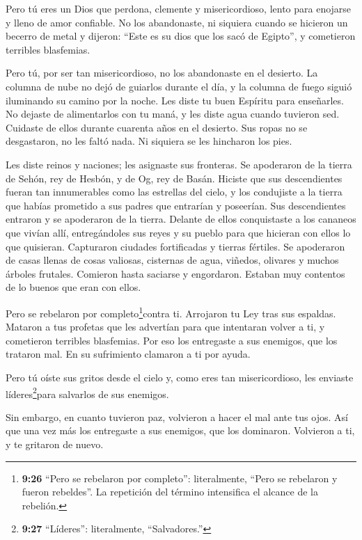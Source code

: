 Pero tú eres un Dios que perdona, clemente y misericordioso, lento para
enojarse y lleno de amor confiable. No los abandonaste,  ni
siquiera cuando se hicieron un becerro de metal y dijeron: ``Este es su
dios que los sacó de Egipto'', y cometieron terribles blasfemias.

 Pero tú, por ser tan misericordioso, no los abandonaste en
el desierto. La columna de nube no dejó de guiarlos durante el día, y la
columna de fuego siguió iluminando su camino por la noche. 
Les diste tu buen Espíritu para enseñarles. No dejaste de alimentarlos
con tu maná, y les diste agua cuando tuvieron sed. 
Cuidaste de ellos durante cuarenta años en el desierto. Sus ropas no se
desgastaron, no les faltó nada. Ni siquiera se les hincharon los pies.

 Les diste reinos y naciones; les asignaste sus fronteras.
Se apoderaron de la tierra de Sehón, rey de Hesbón, y de Og, rey de
Basán.  Hiciste que sus descendientes fueran tan
innumerables como las estrellas del cielo, y los condujiste a la tierra
que habías prometido a sus padres que entrarían y poseerían.
 Sus descendientes entraron y se apoderaron de la tierra.
Delante de ellos conquistaste a los cananeos que vivían allí,
entregándoles sus reyes y su pueblo para que hicieran con ellos lo que
quisieran.  Capturaron ciudades fortificadas y tierras
fértiles. Se apoderaron de casas llenas de cosas valiosas, cisternas de
agua, viñedos, olivares y muchos árboles frutales. Comieron hasta
saciarse y engordaron. Estaban muy contentos de lo buenos que eran con
ellos.

 Pero se rebelaron por completo\footnote{\textbf{9:26}
  ``Pero se rebelaron por completo'': literalmente, ``Pero se rebelaron
  y fueron rebeldes''. La repetición del término intensifica el alcance
  de la rebelión.}contra ti. Arrojaron tu Ley tras sus espaldas. Mataron
a tus profetas que les advertían para que intentaran volver a ti, y
cometieron terribles blasfemias.  Por eso los entregaste a
sus enemigos, que los trataron mal. En su sufrimiento clamaron a ti por
ayuda.

Pero tú oíste sus gritos desde el cielo y, como eres tan misericordioso,
les enviaste líderes\footnote{\textbf{9:27} ``Líderes'': literalmente,
  ``Salvadores.''}para salvarlos de sus enemigos.

 Sin embargo, en cuanto tuvieron paz, volvieron a hacer el
mal ante tus ojos. Así que una vez más los entregaste a sus enemigos,
que los dominaron. Volvieron a ti, y te gritaron de nuevo.

